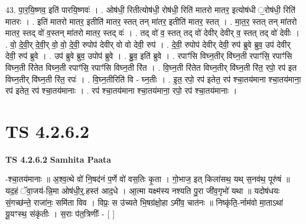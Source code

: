 \documentclass[17pt]{extarticle}
\begin{document}
43. पा॒र॒यि॒ष्णव॒ इति॑ पारयि॒ष्णवः॑ । . ओष॑धी॒ रितीत्योष॑धी॒ रोष॑धी॒ रिति॑ मातरो मातर॒ इत्योष॑धी ॒रोष॑धी॒ रिति॑ मातरः । . इति॑ मातरो मातर॒ इतीति॑ मातर॒ स्तत् तन् मा॑तर॒ इतीति॑ मातर॒ स्तत् । . मा॒त॒र॒ स्तत् तन् मा॑तरो मातर॒ स्तद् वो॑ व॒स्तन् मा॑तरो मातर॒ स्तद् वः॑ । . तद् वो॑ व॒ स्तत् तद् वो॑ देवीर् देवीर् व॒ स्तत् तद् वो॑ देवीः । . वो॒ दे॒वी॒र् दे॒वी॒र् वो॒ वो॒ दे॒वी॒ रुपोप॑ देवीर् वो वो देवी॒ रुप॑ । . दे॒वी॒ रुपोप॑ देवीर् देवी॒ रुप॑ ब्रुवे ब्रुव॒ उप॑ देवीर् देवी॒ रुप॑ ब्रुवे । . उप॑ ब्रुवे ब्रुव॒ उपोप॑ ब्रुवे । . ब्रु॒व॒ इति॑ ब्रुवे । . रपाꣳ॑सि विघ्न॒तीर् वि॑घ्न॒ती रपाꣳ॑सि॒ रपाꣳ॑सि विघ्न॒ती रि॑तेत विघ्न॒ती रपाꣳ॑सि॒ रपाꣳ॑सि विघ्न॒ती रि॑त । . वि॒घ्न॒ती रि॑तेत विघ्न॒तीर् वि॑घ्न॒ती रि॑त॒ रपो॒ रप॑ इत विघ्न॒तीर् वि॑घ्न॒ती रि॑त॒ रपः॑ । . वि॒घ्न॒तीरिति॑ वि - घ्न॒तीः । . इ॒त॒ रपो॒ रप॑ इतेत॒ रप॑ श्चा॒तय॑माना श्चा॒तय॑माना॒ रप॑ इतेत॒ रप॑ श्चा॒तय॑मानाः । . रप॑ श्चा॒तय॑माना श्चा॒तय॑माना॒ रपो॒ रप॑ श्चा॒तय॑मानाः । \newline
\pagebreak
{}

\section{ TS 4.2.6.2 }

\textbf{TS 4.2.6.2 } \newline
\textbf{Samhita Paata} \newline

-श्चा॒तय॑मानाः ॥ अ॒श्व॒त्थे वो॑ नि॒षद॑नं प॒र्णे वो॑ वस॒तिः कृ॒ता । गो॒भाज॒ इत् किला॑सथ॒ यथ् स॒नव॑थ॒ पूरु॑षं ॥ यद॒हं ॅवा॒जय॑-न्नि॒मा ओष॑धी॒र्॒.हस्त॑ आद॒धे । आ॒त्मा यक्ष्म॑स्य नश्यति पु॒रा जी॑व॒गृभो॑ यथा ॥ यदोष॑धयः सं॒गच्छ॑न्ते॒ राजा॑नः॒ समि॑ता विव । विप्रः॒ स उ॑च्यते भि॒षग्र॑क्षो॒हा ऽमी॑व॒ चात॑नः ॥ निष्कृ॑ति॒-र्नाम॑वो मा॒ताऽथा॑ यू॒यꣳस्थ॒ संकृ॑तीः । स॒राः प॑त॒त्रिणीः᳚ - [  ] \newline
\end{document}
